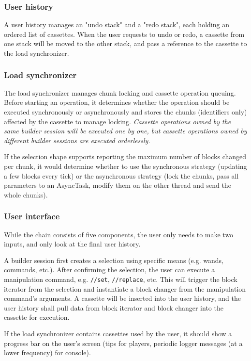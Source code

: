 \documentclass{article}
\begin{document}
			\subsubsection{User history}
				A user history manages an "undo stack" and a "redo stack", each holding an ordered list of cassettes.
				When the user requests to undo or redo, a cassette from one stack will be moved to the other stack, and
				pass a reference to the cassette to the load synchronizer.

			\subsubsection{Load synchronizer}
				The load synchronizer manages chunk locking and cassette operation queuing. Before starting an
				operation, it determines whether the operation should be executed synchronously or asynchronously and
				stores the chunks (identifiers only) affected by the cassette to manage locking. \emph{Cassette
				operations owned by the same builder session will be executed one by one, but cassette operations owned
				by different builder sessions are executed orderlessly.}

				If the selection shape supports reporting the maximum number of blocks changed per chunk, it would
				determine whether to use the synchronous strategy (updating a few blocks every tick) or the
				asynchronous strategy (lock the chunks, pass all parameters to an AsyncTask, modify them on the other
				thread and send the whole chunks).

			\subsubsection{User interface}
				While the chain consists of five components, the user only needs to make two inputs, and only look at
				the final user history.

				A builder session first creates a selection using specific means (e.g. wands, commands, etc.). After
				confirming the selection, the user can execute a manipulation command, e.g. \texttt{//set},
				\texttt{//replace}, etc. This will trigger the block iterator from the selection and instantiate a
				block changer from the manipulation command's arguments. A cassette will be inserted into the user
				history, and the user history shall pull data from block iterator and block changer into the cassette
				for execution.

				If the load synchronizer contains cassettes used by the user, it should show a progress bar on the
				user's screen (tips for players, periodic logger messages (at a lower frequency) for console).
\end{document}
